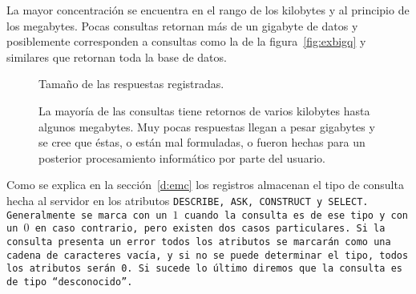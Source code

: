 La mayor concentración se encuentra en el rango de los kilobytes y al principio
de los megabytes.
Pocas consultas retornan más de un gigabyte de datos y posiblemente
corresponden a consultas como la de la figura~\ref{fig:exbigq} y similares que
retornan toda la base de datos.

\begin{figure}[ht]
  \caption{Tamaño de las respuestas registradas.}\label{fig:size}
  \vspace{-.2cm}
  \caption*{\small
    La mayoría de las consultas tiene retornos de varios kilobytes hasta algunos
    megabytes. Muy pocas respuestas llegan a pesar gigabytes y se cree
    que éstas, o están mal formuladas, o fueron hechas para un posterior
    procesamiento informático por parte del usuario. 
  }
\end{figure}

Como se explica en la sección~\ref{d:emc} los registros almacenan el tipo de
consulta hecha al servidor en los atributos \tt{DESCRIBE}, \tt{ASK},
\tt{CONSTRUCT} y \tt{SELECT}. Generalmente se marca con un $1$ cuando la
consulta es de ese tipo y con un $0$ en caso contrario, pero existen dos casos
particulares.
Si la consulta presenta un error todos los atributos se marcarán como una cadena
de caracteres vacía, y si no se puede determinar el tipo, todos los atributos
serán 0. Si sucede lo último diremos que la consulta es de tipo ``desconocido''.

